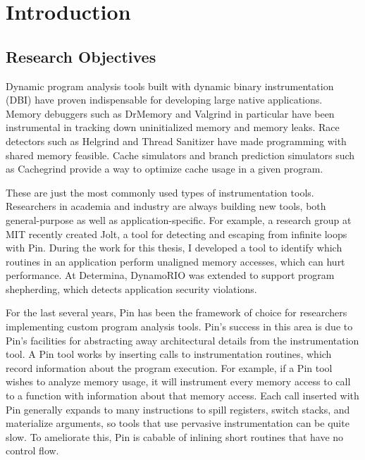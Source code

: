 \chapter{Introduction}

\section{Research Objectives}

Dynamic program analysis tools built with dynamic binary instrumentation (DBI)
have proven indispensable for developing large native applications.  Memory
debuggers such as DrMemory\cite{drmemory} and Valgrind\cite{valgrind} in
particular have been instrumental in tracking down uninitialized memory and
memory leaks.  Race detectors such as Helgrind\cite{helgrind} and Thread
Sanitizer\cite{tsan} have made programming with shared memory feasible.  Cache
simulators and branch prediction simulators such as
Cachegrind\cite{valgrind_workloads} provide a way to optimize cache usage in a
given program.

These are just the most commonly used types of instrumentation tools.
Researchers in academia and industry are always building new tools, both
general-purpose as well as application-specific.  For example, a research group
at MIT recently created Jolt\cite{jolt}, a tool for detecting and escaping from
infinite loops with Pin\cite{pin}.  During the work for this thesis, I developed
a tool to identify which routines in an application perform unaligned memory
accesses, which can hurt performance.  At Determina, DynamoRIO was extended to
support program shepherding\cite{shepherding}, which detects application
security violations.

For the last several years, Pin has been the framework of choice for researchers
implementing custom program analysis tools.  Pin's success in this area is due
to Pin's facilities for abstracting away architectural details from the
instrumentation tool.  A Pin tool works by inserting calls to instrumentation
routines, which record information about the program execution.  For example, if
a Pin tool wishes to analyze memory usage, it will instrument every memory
access to call to a function with information about that memory access.  Each
call inserted with Pin generally expands to many instructions to spill
registers, switch stacks, and materialize arguments, so tools that use pervasive
instrumentation can be quite slow.  To ameliorate this, Pin is cabable of
inlining short routines that have no control flow.

